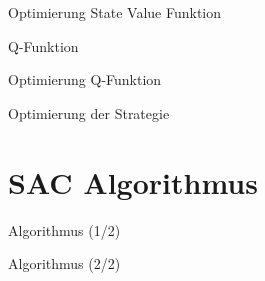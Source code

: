\begin{frame}{Optimierung State Value Funktion}

\end{frame}

\begin{frame}{Q-Funktion}

\end{frame}

\begin{frame}{Optimierung Q-Funktion}

\end{frame}

\begin{frame}{Optimierung der Strategie}

\end{frame}

\section{SAC Algorithmus}

\begin{frame}{Algorithmus (1/2)}

\end{frame}

\begin{frame}{Algorithmus (2/2)}

\end{frame}






